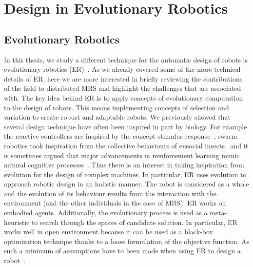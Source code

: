 
\section{Design in Evolutionary Robotics}


  \subsection{Evolutionary Robotics} %

    In this thesis, we study a different technique for the automatic design of robots is evolutionary robotics (ER)~\parencite{Nolfi2000, Doncieux2015a}. As we already covered some of the more technical details of ER, here we are more interested in briefly reviewing the contributions of the field to distributed MRS and highlight the challenges that are associated with. The key idea behind ER is to apply concepts of evolutionary computation to the design of robots. This means implementing concepts of selection and variation to create robust and adaptable robots. We previously showed that several design technique have often been inspired in part by biology. For example the reactive controllers are inspired by the concept stimulus-response~\parencite{Brooks1986}, swarm robotics took inspiration from the collective behaviours of eusocial insects~\parencite{Bonabeau1999} and it is sometimes argued that major advancements in reinforcement learning mimic natural cognitive processes~\parencite{Montague1996}. Thus there is an interest in taking inspiration from evolution for the design of complex machines. In particular, ER uses evolution to approach robotic design in an holistic manner. The robot is considered as a whole and the evolution of its behaviour results from the interaction with the environment (and the other individuals in the case of MRS): ER works on embodied agents. Additionally, the evolutionary process is used as a meta-heuristic to search through the spaces of candidate solution. In particular, ER works well in open environment because it can be used as a black-box optimization technique thanks to a loose formulation of the objective function. As such a minimum of assumptions have to been made when using ER to design a robot~\parencite{Bongard2013a}.

